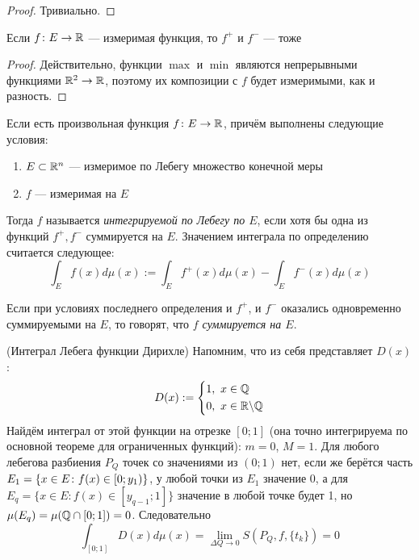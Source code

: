 \begin{proof}
	Тривиально.
\end{proof}

\begin{proposition}
	Если $f \colon E \to \mathbb{R}$ --- измеримая функция, то $f^+$ и $f^-$ --- тоже
\end{proposition}

\begin{proof}
	Действительно, функции $\max$ и $\min$ являются непрерывными функциями $\mathbb{R}^2 \to \mathbb{R}$, поэтому их композиции с $f$ будет измеримыми, как и разность.
\end{proof}

\begin{definition}
	Если есть произвольная функция $f \colon E \to \mathbb{R}$, причём выполнены следующие условия:
	\begin{enumerate}
		\item $E \subset \mathbb{R}^n$ --- измеримое по Лебегу множество конечной меры
		
		\item $f$ --- измеримая на $E$
	\end{enumerate}
	Тогда $f$ называется \textit{интегрируемой по Лебегу по $E$}, если хотя бы одна из функций $f^+, f^-$ суммируется на $E$. Значением интеграла по определению считается следующее:
	\[
		\int_E f(x)d\mu(x) := \int_E f^+(x)d\mu(x) - \int_E f^-(x)d\mu(x)
	\]
\end{definition}

\begin{definition}
	Если при условиях последнего определения и $f^+$, и $f^-$ оказались одновременно суммируемыми на $E$, то говорят, что \textit{$f$ суммируется на $E$}.
\end{definition}

\begin{example} (Интеграл Лебега функции Дирихле)
	Напомним, что из себя представляет $D(x)$:
	\[
		D(x) := \left\{\begin{aligned}
			&{1,\ x \in \mathbb{Q}}
			\\
			&{0,\ x \in \mathbb{R} \backslash \mathbb{Q}}
		\end{aligned}\right.
	\]
	Найдём интеграл от этой функции на отрезке $[0; 1]$ (она точно интегрируема по основной теореме для ограниченных функций): $m = 0$, $M = 1$. Для любого лебегова разбиения $P_Q$ точек со значениями из $(0; 1)$ нет, если же берётся часть $E_1 = \{x \in E \colon f(x) \in \left[0; y_1\right)\}$, у любой точки из $E_1$ значение 0, а для $E_q = \{x \in E \colon f(x) \in [y_{q - 1}; 1]\}$ значение в любой точке будет 1, но $\mu(E_q) = \mu(\mathbb{Q} \cap [0; 1]) = 0$. Следовательно
	\[
		\int_{[0; 1]} D(x)d\mu(x) = \lim_{\Delta Q \to 0} S(P_Q, f, \{t_k\}) = 0
	\]
\end{example}
